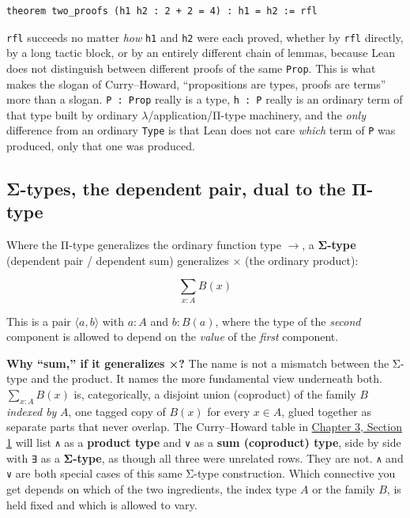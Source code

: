 \begin{lstlisting}
theorem two_proofs (h1 h2 : 2 + 2 = 4) : h1 = h2 := rfl
\end{lstlisting}

\texttt{rfl} succeeds no matter \emph{how} \texttt{h1} and \texttt{h2} were each proved, whether by \texttt{rfl} directly, by a long tactic block, or by an entirely different chain of lemmas, because Lean does not distinguish between different proofs of the same \texttt{Prop}. This is what makes the slogan of Curry--Howard, ``propositions are types, proofs are terms'' more than a slogan. \texttt{P : Prop} really is a type, \texttt{h : P} really is an ordinary term of that type built by ordinary \(\lambda\)/application/Π-type machinery, and the \emph{only} difference from an ordinary \texttt{Type} is that Lean does not care \emph{which} term of \texttt{P} was produced, only that one was produced.

\subsection{Σ-types, the dependent pair, dual to the Π-type}\label{sec:01-basics:05-pi-sigma-and-coc:4}

Where the Π-type generalizes the ordinary function type \(\to\), a \textbf{Σ-type} (dependent pair / dependent sum) generalizes \(\times\) (the ordinary product):

\[
\sum_{x:A} B(x)
\]

This is a pair \(\langle a, b\rangle\) with \(a : A\) and \(b : B(a)\), where the type of the \emph{second} component is allowed to depend on the \emph{value} of the \emph{first} component.

\textbf{Why ``sum,'' if it generalizes ×?} The name is not a mismatch between the Σ-type and the product. It names the more fundamental view underneath both. \(\sum_{x:A} B(x)\) is, categorically, a disjoint union (coproduct) of the family \(B\) \emph{indexed by} \(A\), one tagged copy of \(B(x)\) for every \(x \in A\), glued together as separate parts that never overlap. The Curry--Howard table in \hyperref[sec:03-propositions-and-proofs:01-prop:1]{Chapter 3, Section 1} will list \texttt{∧} as a \textbf{product type} and \texttt{∨} as a \textbf{sum (coproduct) type}, side by side with \texttt{∃} as a \textbf{Σ-type}, as though all three were unrelated rows. They are not. \texttt{∧} and \texttt{∨} are both special cases of this same Σ-type construction. Which connective you get depends on which of the two ingredients, the index type \(A\) or the family \(B\), is held fixed and which is allowed to vary.

